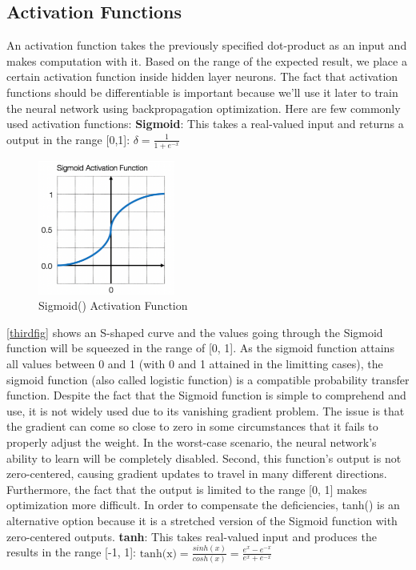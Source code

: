 \documentclass[a4paper,11pt,oneside]{book}
\begin{document}
\subsection{Activation Functions}
An activation function takes the previously specified dot-product as an input and makes computation with it. Based on the range of the expected result, we place a certain activation function inside hidden layer neurons. The fact that activation functions should be differentiable is important because we'll use it later to train the neural network using backpropagation optimization.
\newline\newline
Here are few commonly used activation functions:\newline\newline
\textbf{Sigmoid}: This takes a real-valued input and returns a output in the range [0,1]:\newline\newline
$\delta = \frac{1}{1+e^{-x}}$
\begin{figure}[!h]
	\centering
	\includegraphics[width=0.4\textwidth]{figures/neuro}
	\caption{Sigmoid() Activation Function}
	\label{thirdfig}
\end{figure}

\autoref{thirdfig} shows an S-shaped curve and the values going
through the Sigmoid function will be squeezed in the range of [0, 1].
As the sigmoid function attains all values between 0 and 1 (with 0 and 1 attained in the limitting cases), the sigmoid function (also called logistic function) is a compatible probability transfer function.
Despite the fact that the Sigmoid function is simple to comprehend and use, it is not widely used due to its vanishing gradient problem. The issue is that the gradient can come so close to zero in some circumstances that it fails to properly adjust the weight. In the worst-case scenario, the neural network's ability to learn will be completely disabled. Second, this function's output is not zero-centered, causing gradient updates to travel in many different directions. Furthermore, the fact that the output is limited to the range [0, 1] makes optimization more difficult.
In order to compensate the deficiencies, tanh() is an alternative option
because it is a stretched version of the Sigmoid function with zero-centered outputs. \newline\newline
\textbf{tanh}: This takes real-valued input and produces the results in the range [-1, 1]:\newline\newline
$\text{tanh(x)}=\frac{sinh(x)}{cosh(x)}=\frac{e^{x}-e^{-x}}{e^{x}+e^{-x}}$
\end{document}
